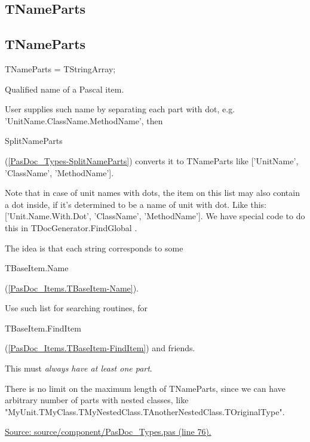 \documentclass{report}
\newif\ifpdf
\begin{document}
\subsection*{\large{\textbf{TNameParts}}\normalsize\hspace{1ex}\hrulefill}
\else
\subsection*{TNameParts}
\fi
\label{PasDoc_Types-TNameParts}
\begin{list}{}{
\setlength{\itemindent}{0cm}
\setlength{\listparindent}{0cm}
\setlength{\leftmargin}{\evensidemargin}
\addtolength{\leftmargin}{\tmplength}
\settowidth{\labelsep}{X}
\addtolength{\leftmargin}{\labelsep}
\setlength{\labelwidth}{\tmplength}
}
\item[\textbf{Declaration}\hfill]
\ifpdf
\begin{flushleft}
\fi
\begin{ttfamily}
TNameParts = TStringArray;\end{ttfamily}

\ifpdf
\end{flushleft}
\fi

\par
\item[\textbf{Description}]
Qualified name of a Pascal item.

User supplies such name by separating each part with dot, e.g. 'UnitName.ClassName.MethodName', then \begin{ttfamily}SplitNameParts\end{ttfamily}(\ref{PasDoc_Types-SplitNameParts}) converts it to TNameParts like ['UnitName', 'ClassName', 'MethodName'].

Note that in case of unit names with dots, the item on this list may also contain a dot inside, if it's determined to be a name of unit with dot. Like this: ['Unit.Name.With.Dot', 'ClassName', 'MethodName']. We have special code to do this in TDocGenerator.FindGlobal .

The idea is that each string corresponds to some \begin{ttfamily}TBaseItem.Name\end{ttfamily}(\ref{PasDoc_Items.TBaseItem-Name}).

Use such list for searching routines, for \begin{ttfamily}TBaseItem.FindItem\end{ttfamily}(\ref{PasDoc_Items.TBaseItem-FindItem}) and friends.

This must \textit{always have at least one part}.

There is no limit on the maximum length of TNameParts, since we can have arbitrary number of parts with nested classes, like "MyUnit.TMyClass.TMyNestedClass.TAnotherNestedClass.TOriginalType".\par
\href{https://github.com/pasdoc/pasdoc/blob/master/source/component/PasDoc_Types.pas#L76}{Source: source/component/PasDoc{\_}Types.pas (line 76).}

\end{list}
\ifpdf
\end{document}
